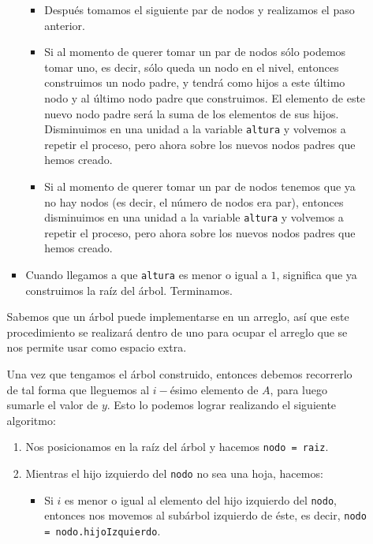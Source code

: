 \documentclass[letterpaper,11pt]{article}
\begin{document}
\begin{enumerate}
\begin{itemize}
\begin{itemize}
\begin{itemize}
                \item Después tomamos el siguiente par de nodos y realizamos 
                el paso anterior. 
                
                \item Si al momento de querer tomar un par de nodos sólo podemos 
                tomar uno, es decir, sólo queda un nodo en el nivel, entonces 
                construimos un nodo padre, y tendrá como hijos a este último nodo 
                y al último nodo padre que construimos. El elemento de este 
                nuevo nodo padre será la suma de los elementos de sus hijos. 
                Disminuimos en una unidad a la variable \texttt{altura} y 
                volvemos a repetir el proceso, pero ahora sobre los nuevos nodos 
                padres que hemos creado.

                \item Si al momento de querer tomar un par de nodos tenemos 
                que ya no hay nodos (es decir, el número de nodos era par), 
                entonces disminuimos en una unidad a la variable \texttt{altura}
                y volvemos a repetir el proceso, pero ahora sobre los nuevos 
                nodos padres que hemos creado. 
            \end{itemize}

            \item Cuando llegamos a que \texttt{altura} es menor o igual a $1$, 
            significa que ya construimos la raíz del árbol. Terminamos.
        \end{itemize}

        Sabemos que un árbol puede implementarse en un arreglo, así que este 
        procedimiento se realizará dentro de uno para ocupar el arreglo que se 
        nos permite usar como espacio extra. 
        
        Una vez que tengamos el árbol construido, entonces debemos recorrerlo de 
        tal forma que lleguemos al $i-$ésimo elemento de $A$, para luego sumarle 
        el valor de $y$. Esto lo podemos lograr realizando el siguiente 
        algoritmo:
        \begin{enumerate}
            \item Nos posicionamos en la raíz del árbol y hacemos 
            \texttt{nodo = raiz}. 

            \item Mientras el hijo izquierdo del \texttt{nodo} no sea una 
            hoja, hacemos:
            \begin{itemize}
                \item Si $i$ es menor o igual al elemento del hijo izquierdo 
                del \texttt{nodo}, entonces nos movemos al subárbol izquierdo 
                de éste, es decir, \texttt{nodo = nodo.hijoIzquierdo}.


\end{itemize}
\end{enumerate}
\end{itemize}
\end{enumerate}
\end{document}
